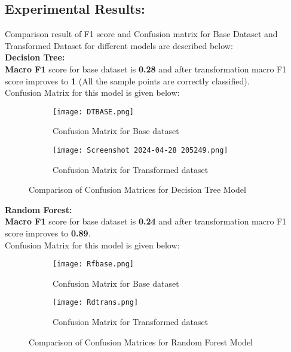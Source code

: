 \documentclass[11pt, oneside]{article}   	%
\begin{document}
\subsection{Experimental Results:} Comparison result of F1 score and Confusion matrix for Base Dataset and Transformed Dataset for different models are described below:\\
\textbf{Decision Tree:}\\
\textbf{Macro F1} score for base dataset is \textbf{0.28} and after transformation macro F1 score improves to \textbf{1} (All the sample points are correctly classified).\\
Confusion Matrix for this model is given below:\\
\begin{figure}[H]
  \begin{subfigure}[b]{0.30\textwidth}
    \centering
    \texttt{[image: DTBASE.png]}
    \caption{Confusion Matrix for Base dataset}
    \label{fig:confusion_matrix_base}
  \end{subfigure}
  \hfill
  \begin{subfigure}[b]{0.30\textwidth}
    \centering
    \texttt{[image: Screenshot 2024-04-28 205249.png]}
    \caption{Confusion Matrix for Transformed dataset}
    \label{fig:confusion_matrix_transformed}
  \end{subfigure}
  \caption{Comparison of Confusion Matrices for Decision Tree Model}
  \label{fig:confusion_matrices}
\end{figure}
\textbf{Random Forest:}\\
\textbf{Macro F1} score for base dataset is \textbf{0.24} and after transformation macro F1 score improves to \textbf{0.89}.\\ Confusion Matrix for this model is given below:\\
\begin{figure}[H]
  \begin{subfigure}[b]{0.32\textwidth}
    \centering
    \texttt{[image: Rfbase.png]}
    \caption{Confusion Matrix for Base dataset}
    \label{fig:confusion_matrix_base}
  \end{subfigure}
  \hfill
  \begin{subfigure}[b]{0.32\textwidth}
    \centering
    \texttt{[image: Rdtrans.png]}
    \caption{Confusion Matrix for Transformed dataset}
    \label{fig:confusion_matrix_transformed}
  \end{subfigure}
  \caption{Comparison of Confusion Matrices for Random Forest Model}
  \label{fig:confusion_matrices}
\end{figure}
\end{document}
